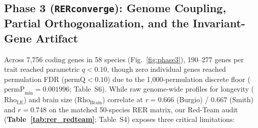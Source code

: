 \documentclass[10pt,a4paper,twocolumn]{article}
\begin{document}
\subsection{Phase 3 (\texttt{RERconverge}): Genome Coupling, Partial Orthogonalization, and the Invariant-Gene Artifact}
Across 7,756 coding genes in 58 species (Fig.~\ref{fig:phase3}), 190--277 genes per trait reached parametric $q < 0.10$, though zero individual genes reached permulation FDR ($\text{permQ} < 0.10$) due to the 1,000-permulation discrete floor ($\text{permP}_{\min} = 0.001996$; Table~S6). While raw genome-wide profiles for longevity ($\text{Rho}_{\text{LE}}$) and brain size ($\text{Rho}_{\text{Brain}}$) correlate at $r = 0.666$ (Burgio) / $0.667$ (Smith) and $r = 0.748$ on the matched 50-species RER matrix, our Red-Team audit (\textbf{Table~\ref{tab:rer_redteam}}; Table~S4) exposes three critical limitations:
\end{document}
